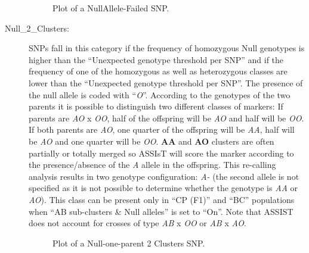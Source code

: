 \documentclass[a4paper,11pt,english]{article}
\begin{document}
\begin{description}
\begin{figure}[H]
\caption{Plot of a NullAllele-Failed SNP.}\end{figure}

\item [Null\_2\_Clusters:] SNPs fall in this category if the frequency of homozygous Null
genotypes is higher than the ``Unexpected genotype threshold per SNP'' and if the frequency of one
of the homozygous as well as heterozygous classes are lower than the ``Unexpected genotype
threshold per
SNP''. The presence of the null allele is coded with ``\emph{O}''. According to the genotypes of the
two parents it is possible to distinguish two different classes of markers: If parents are \emph{AO}
x \emph{OO}, half of the offspring will be \emph{AO} and half will be \emph{OO}. If both parents are
\emph{AO}, one quarter of the offspring will be \emph{AA}, half  will be \emph{AO} and one quarter 
will be \emph{OO}. \textbf{AA} and \textbf{AO} clusters are often partially or totally merged so
ASSIsT will score the marker according to the presence/absence of the \emph{A} allele in the
offspring.
This re-calling analysis results in two genotype configuration: \emph{A-}
(the second allele is not specified as it is not possible to determine whether the genotype is
\emph{AA} or \emph{AO}). This class can be present only in ``CP (F1)'' and ``BC'' populations
when ``AB sub-clusters \& Null alleles'' is set to ``On''.
Note that  ASSIST does not account for crosses of type \emph{AB} x \emph{OO} or \emph{AB} x
\emph{AO}.
\begin{figure}[H]
\centering
\capstart

\caption{Plot of a Null-one-parent 2 Clusters SNP.}\end{figure}


\end{description}
\end{document}
